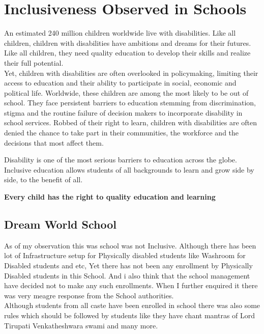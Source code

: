 \renewcommand{\chaptername}{}
\chapter{Inclusiveness Observed in Schools}
An estimated 240 million children worldwide live with disabilities. Like all children, children with disabilities have ambitions and dreams for their futures. Like all children, they need quality education to develop their skills and realize their full potential.\\

Yet, children with disabilities are often overlooked in policymaking, limiting their access to education and their ability to participate in social, economic and political life. Worldwide, these children are among the most likely to be out of school. They face persistent barriers to education stemming from discrimination, stigma and the routine failure of decision makers to incorporate disability in school services. Robbed of their right to learn, children with disabilities are often denied the chance to take part in their communities, the workforce and the decisions that most affect them.

Disability is one of the most serious barriers to education across the globe. Inclusive education allows students of all backgrounds to learn and grow side by side, to the benefit of all.

    
\begin{center}
\textbf{Every child has the right to quality education and learning}
\end{center}

\section{Dream World School}
As of my observation this was school was not Inclusive. Although there has been lot of Infrastructure setup for Physically disabled students like Washroom for Disabled students and etc, Yet there has not been any enrollment by Physically Disabled students in this School. And i also think that the school management have decided not to make any such enrollments. When I further enquired it there was very meagre response from the School authorities.\\

Although students from all caste have been enrolled in school there was also some rules which should be followed by students like they have chant mantras of Lord Tirupati Venkatheshwara swami and many more.\\

